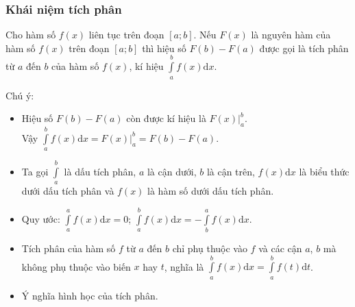 \subsubsection{Khái niệm tích phân}
Cho hàm số $f(x)$ liên tục trên đoạn $\left[a;b\right]$. Nếu $F(x)$ là nguyên hàm của hàm số $f(x)$ trên đoạn $\left[a;b\right]$ thì hiệu số $F(b)-F(a)$ được gọi là tích phân từ $a$ đến $b$ của hàm số $f(x)$, kí hiệu $\displaystyle\int\limits_a^bf(x)\mathrm{d}x$.\\
\begin{note}Chú ý:
	\begin{itemize}
		\item Hiệu số $F(b)-F(a)$ còn được kí hiệu là $ F(x)\big|_a^b$.\\
		Vậy $\displaystyle\int\limits_a^bf(x)\mathrm{d}x= F(x)\big|_a^b=F(b)-F(a)$.
		\item Ta gọi $\displaystyle\int\limits_a^b{}$ là dấu tích phân, $a$ là cận dưới, $b$ là cận trên, $f(x)\mathrm{d}x$ là biểu thức dưới dấu tích phân và $f(x)$ là hàm số dưới dấu tích phân.
		\item Quy ước: $\displaystyle\int\limits_a^af(x)\mathrm{d}x=0$; $\displaystyle\int\limits_a^bf(x)\mathrm{d}x=-\displaystyle\int\limits_b^af(x)\mathrm{d}x$.
		\item Tích phân của hàm số $f$ từ $a$ đến $b$ chỉ phụ thuộc vào $f$ và các cận $a$, $b$ mà không phụ thuộc vào biến $x$ hay $t$, nghĩa là $\displaystyle\int\limits_a^bf(x)\mathrm{d}x=\displaystyle\int\limits_a^bf(t)\mathrm{d}t$.
		\item Ý nghĩa hình học của tích phân.\\
	\end{itemize}
\end{note}

